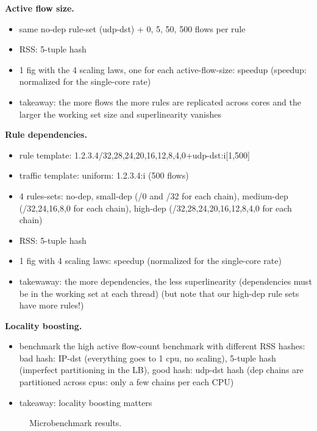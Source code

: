 \noindent
\textbf{Active flow size.} %
\begin{itemize}
\item same no-dep rule-set (udp-dst) + 0, 5, 50, 500 flows per rule
\item RSS: 5-tuple hash
\item 1 fig with the 4 scaling laws, one for each active-flow-size: speedup (speedup: normalized for the single-core rate)
\item takeaway: the more flows the more rules are replicated across cores and the larger the working set size and superlinearity vanishes
\end{itemize}

\noindent%
\textbf{Rule dependencies.} %
\begin{itemize}
\item rule template: 1.2.3.4/{32,28,24,20,16,12,8,4,0}+udp-dst:i[1,500]
\item traffic template: uniform: 1.2.3.4:i (500 flows)
\item 4 rules-sets: no-dep, small-dep (/0 and /32 for each chain), medium-dep (/{32,24,16,8,0} for each chain), high-dep (/{32,28,24,20,16,12,8,4,0} for each chain)
\item RSS: 5-tuple hash
\item 1 fig with 4 scaling laws: speedup (normalized for the single-core rate)
\item takewaway: the more dependencies, the less superlinearity (dependencies must be in the working set at each thread) (but note that our high-dep rule sets have more rules!)
\end{itemize}

\noindent%
\textbf{Locality boosting.} %
\begin{itemize}
\item benchmark the high active flow-count benchmark with different RSS hashes: bad hash: IP-dst (everything goes to 1 cpu, no scaling), 5-tuple hash (imperfect partitioning in the LB), good hash: udp-dst hash (dep chains are partitioned across cpus: only a few chains per each CPU)
\item takeaway: locality boosting matters
\end{itemize}

\begin{figure*}
  \centering
  \hspace{-1.5em}
  \hspace{-1.5em}
  \hspace{-1.5em}
  \caption{Microbenchmark results.}
  \label{fig:microbenchmark}
\end{figure*}


